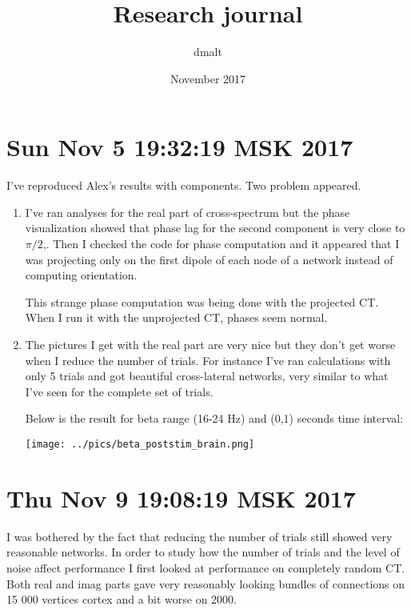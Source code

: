 \documentclass{article}
\title{Research journal}
\author{dmalt}
\date{November 2017}
\begin{document}
\maketitle



\section{Sun Nov  5 19:32:19 MSK 2017}

I've reproduced Alex's results with components.
Two problem appeared.
\begin{enumerate}
\item I've ran analyses for the real part of cross-spectrum
  but the phase visualization showed that phase lag for the second
  component is very close to $\pi/2$,. Then I checked the code for phase computation
  and it appeared that I was projecting only on the first dipole of each node of a
  network instead of computing orientation.

  This strange phase computation was being done with the projected CT.
  When I run it with the unprojected CT, phases seem normal.

\item The pictures I get with the real part are very nice but they don't get worse
  when I reduce the number of trials. For instance I've ran calculations with only 
  5 trials and got beautiful cross-lateral networks, very similar to what I've seen
  for the complete set of trials.

  Below is the result for beta range (16-24 Hz) and (0,1) seconds time interval:

\texttt{[image: ../pics/beta\_poststim\_brain.png]}
\end{enumerate}
\section{Thu Nov  9 19:08:19 MSK 2017}
I was  bothered by the fact that reducing the number of trials still showed very
reasonable networks.
In order to study how the  number of trials and the level of noise affect performance
I first looked at performance on completely random CT. Both real and imag parts gave
very reasonably looking bundles of connections on 15 000 vertices cortex and a bit worse on
2000. 
\end{document}
